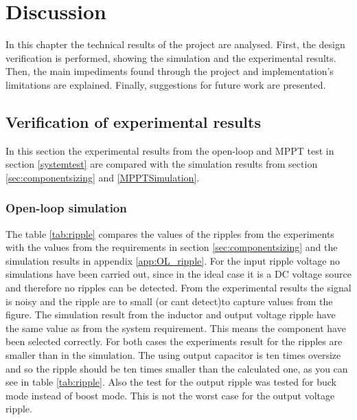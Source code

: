 \chapter{Discussion}

In this chapter the technical results of the project are analysed. First, the design verification is performed, showing the simulation and the experimental results. Then, the main impediments found through the project and implementation's limitations are explained. Finally, suggestions for future work are presented.

\section{Verification of experimental results}
In this section the experimental results from the open-loop and MPPT test in section \ref{systemtest} are compared with the simulation results from section \ref{sec:componentsizing} and \ref{MPPTSimulation}.

\subsection{Open-loop simulation}


The table \ref{tab:ripple} compares the values of the ripples from the experiments with the values from the requirements in section \ref{sec:componentsizing} and the simulation results in appendix \ref{app:OL_ripple}. For the input ripple voltage no simulations have been carried out, since in the ideal case it is a DC voltage source and therefore no ripples can be detected. From the experimental results the signal is noisy and the ripple are to small (or cant detect)to capture values from the figure. The simulation result from the inductor and output voltage ripple have the same value as from the system requirement. This means the component have been selected correctly. For both cases the experiments result for the ripples are smaller than in the simulation. The using output capacitor is ten times oversize and so the ripple should be ten times smaller than the calculated one, as you can see in table \ref{tab:ripple}. Also the test for the output ripple was tested for buck mode instead of boost mode. This is not the worst case for the output voltage ripple.

